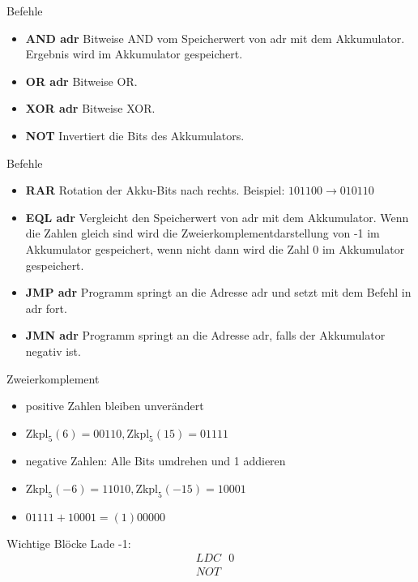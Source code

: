 \begin{frame}{Befehle}
  \begin{itemize}
    \item \textbf{AND adr} Bitweise AND vom Speicherwert von adr mit dem Akkumulator. Ergebnis wird im Akkumulator gespeichert.
    \pause
    \item \textbf{OR adr} Bitweise OR.
    \pause
    \item \textbf{XOR adr} Bitweise XOR.
    \pause
    \item \textbf{NOT} Invertiert die Bits des Akkumulators.
  \end{itemize}
\end{frame}

\begin{frame}{Befehle}
  \begin{itemize}
    \item \textbf{RAR} Rotation der Akku-Bits nach rechts. Beispiel: $101100 \rightarrow 010110$
    \pause
    \item \textbf{EQL adr} Vergleicht den Speicherwert von adr mit dem Akkumulator. Wenn die Zahlen gleich sind wird die Zweierkomplementdarstellung von -1 im Akkumulator gespeichert, wenn nicht dann wird die Zahl 0 im Akkumulator gespeichert.
    \pause
    \item \textbf{JMP adr} Programm springt an die Adresse adr und setzt mit dem Befehl in adr fort.
    \pause
    \item \textbf{JMN adr} Programm springt an die Adresse adr, falls der Akkumulator negativ ist.
  \end{itemize}
\end{frame}

\begin{frame}{Zweierkomplement}
\begin{itemize}
\item positive Zahlen bleiben unverändert
\item $\text{Zkpl}_5(6)=00110,\text{Zkpl}_5(15)=01111$
\item negative Zahlen: Alle Bits umdrehen und 1 addieren
\item $\text{Zkpl}_5(-6)=11010,\text{Zkpl}_5(-15)=10001$
\item $01111+10001=(1)00000$
\end{itemize}
\end{frame}

\begin{frame}{Wichtige Blöcke}
  Lade -1:
  \begin{align*}
    &LDC\text{ }0\\
    &NOT
  \end{align*}
\end{frame}

